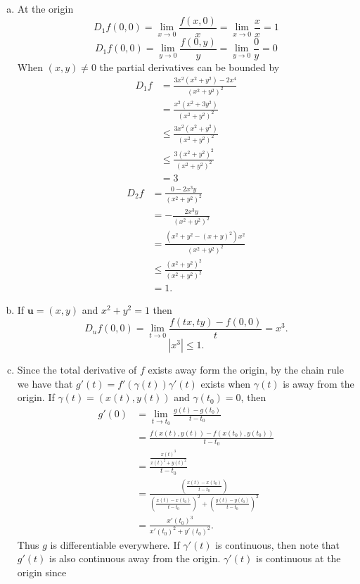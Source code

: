 \documentclass{article}
\begin{document}
\begin{enumerate}[(a)]
  \item At the origin 
  \[  
    D_1 f(0,0) = \lim_{x\to 0} \frac{f(x,0)}{x} = \lim_{x\to 0} \frac{x}{x} = 1
  \]
  \[
    D_1 f(0,0) = \lim_{y\to 0} \frac{f(0,y)}{y}  = \lim_{y\to 0} \frac{0}{y} = 0
  \]
  When $(x,y) \neq 0$ the partial derivatives can be bounded by
  \begin{align*}
    D_1 f &= \frac{3x^2(x^2+y^2) - 2x^4}{(x^2+y^2)^2} \\ 
    &= \frac{x^2(x^2+3y^2)}{(x^2+y^2)^2} \\
    &\leq \frac{3x^2(x^2+y^2)}{(x^2+y^2)^2} \\
    &\leq \frac{3(x^2+y^2)^2}{(x^2+y^2)^2} \\
    &= 3
  \end{align*}
  \begin{align*}
    D_2 f &= \frac{0 - 2x^3y}{(x^2+y^2)^2} \\
    &= -\frac{2x^3y}{(x^2+y^2)^2} \\
    &= \frac{(x^2+y^2-(x+y)^2)x^2}{(x^2+y^2)^2} \\
    &\leq \frac{(x^2+y^2)^2}{(x^2+y^2)^2} \\
    &= 1.
  \end{align*}
  \item If $\bm{u} = (x,y)$ and $x^2 + y^2 = 1$ then
  \[  
    D_u f(0,0) = \lim_{t\to 0}\frac{f(tx, ty) - f(0,0)}{t} = x^3.
  \]
  \[
    |x^3| \leq 1.
  \]
  \item Since the total derivative of $f$ exists away form the origin, by 
  the chain rule we have that $g'(t) = f'(\gamma(t))\gamma'(t)$ exists when $\gamma(t)$
  is away from the origin.
  If $\gamma(t) = (x(t), y(t))$ and $\gamma(t_0) = 0$, then 
  \begin{align*}
    g'(0) &= \lim_{t\to t_0} \frac{g(t)-g(t_0)}{t-t_0} \\
    &= \frac{f(x(t), y(t)) - f(x(t_0), y(t_0))}{t-t_0} \\
    &= \frac{\frac{x(t)^3}{x(t)^2 + y(t)^2}}{t-t_0} \\
    &= \frac{\left(\frac{x(t) - x(t_0)}{t-t_0}\right)}{\left(\frac{x(t) - x(t_0)}{t-t_0}\right)^2 + \left(\frac{y(t) - y(t_0)}{t-t_0}\right)^2} \\
    &= \frac{x'(t_0)^3}{x'(t_0)^2 + y'(t_0)^2}.
  \end{align*}
  Thus $g$ is differentiable everywhere. If $\gamma'(t)$ is continuous, then note that $g'(t)$
  is also continuous away from the origin. 
  $\gamma'(t)$ is continuous at the origin since 

\end{enumerate}
\end{document}
